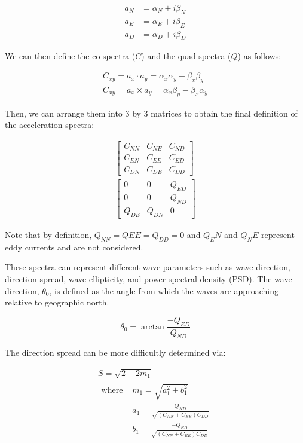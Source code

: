 \begin{align}
    a_N &= \alpha_N + i\beta_N \\
    a_E &= \alpha_E + i\beta_E \\
    a_D &= \alpha_D + i\beta_D
\end{align}

We can then define the co-spectra ($C$) and the quad-spectra ($Q$) as follows:

\begin{gather}
    C_{xy} = a_x \cdot a_y = \alpha_x \alpha_y + \beta_x \beta_y \\
    C_{xy} = a_x \times a_y = \alpha_x \beta_y - \beta_x \alpha_y
\end{gather}

Then, we can arrange them into 3 by 3 matrices to obtain the final definition of the acceleration spectra:

\begin{gather}
    \begin{bmatrix}
        C_{NN} & C_{NE} & C_{ND} \\
        C_{EN} & C_{EE} & C_{ED} \\
        C_{DN} & C_{DE} & C_{DD}
    \end{bmatrix} \\
    \begin{bmatrix}
        0 & 0 & Q_{ED} \\
        0 & 0 & Q_{ND} \\
        Q_{DE} & Q_{DN} & 0
    \end{bmatrix}
\end{gather}

Note that by definition, $Q_{NN}=Q{EE}=Q_{DD}=0$ and $Q_EN$ and $Q_NE$ represent eddy currents and are not considered.

These spectra can represent different wave parameters such as wave direction, direction spread, wave ellipticity, and power spectral density (PSD). 
The wave direction, $\theta_0$, is defined as the angle from which the waves are approaching relative to geographic north.

\begin{equation}
    \theta_0 = \arctan{\frac{-Q_{ED}}{Q_{ND}}}
\end{equation}

The direction spread can be more difficultly determined via:

\begin{gather}
    S = \sqrt{2-2m_1} \\
    \begin{aligned}
        \text{where }   &m_1 = \sqrt{a_1^2 + b_1^2} \\
                        &a_1 = \frac{Q_{ND}}{\sqrt{(C_{NN}+C_{EE})C_{DD}}} \\
                        &b_1 = \frac{-Q_{ED}}{\sqrt{(C_{NN}+C_{EE})C_{DD}}}
    \end{aligned}
\end{gather}

